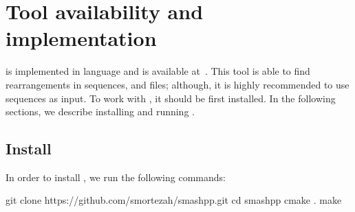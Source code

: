 \clearpage
\section{Tool availability and implementation}
\label{sec.tool}
\smashpp is implemented in \cpp language and is available at~\cite{web-smashpp}. This tool is able to find rearrangements in sequences, \fasta and \fastq files; although, it is highly recommended to use sequences as input. To work with \smashpp, it should be first installed. 
In the following sections, we describe installing and running \smashpp.


\subsection{Install}
In order to install \smashpp, we run the following commands:
\begin{code}[style=bash]
git clone https://github.com/smortezah/smashpp.git
cd smashpp
cmake .
make
\end{code}


